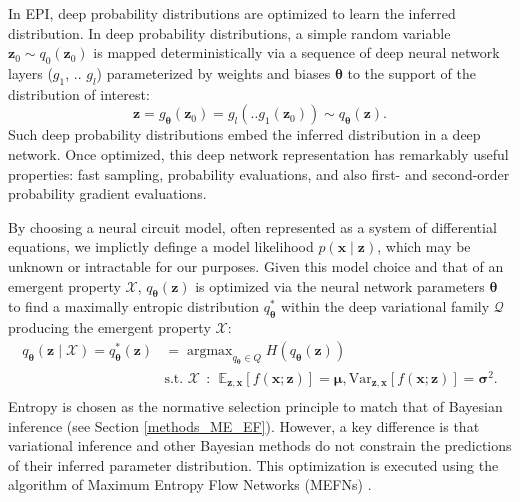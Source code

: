 \documentclass[11pt]{article}
\DeclareMathOperator*{\argmax}{argmax}
\begin{document}
In EPI, deep probability distributions are optimized to learn the inferred distribution.
 In deep probability distributions, a simple random variable $\mathbf{z}_0 \sim q_0(\mathbf{z}_0)$ is mapped deterministically via a sequence of deep neural network layers ($g_1$, .. $g_l$) parameterized by weights and biases $\bm{\theta}$ to the support of the distribution of interest:
\begin{equation}
\label{eq:deep_transform}
\mathbf{z} = g_{\bm{\theta}}(\mathbf{z}_0) = g_l(..g_1(\mathbf{z}_0)) \sim q_{\bm{\theta}}(\mathbf{z}).
\end{equation}
Such deep probability distributions embed the inferred distribution in a deep network.
Once optimized, this deep network representation has remarkably useful properties: fast sampling, probability evaluations, and also first- and second-order probability gradient evaluations.

By choosing a neural circuit model, often represented as a system of differential equations, we implictly definge a model likelihood $p(\mathbf{x} \mid \mathbf{z})$, which may be unknown or intractable for our purposes.  Given this model choice and that of an emergent property $\mathcal{X}$, $q_{\bm{\theta}}(\mathbf{z})$ is optimized via the neural network parameters $\bm{\theta}$ to find a maximally entropic distribution $q_{\bm{\theta}}^*$ within the deep variational family $\mathcal{Q}$ producing the emergent property $\mathcal{X}$:
\begin{equation} \label{eq:opt}
\begin{split}
q_{\bm{\theta}}(\mathbf{z} \mid \mathcal{X}) = q_{\bm{\theta}}^*(\mathbf{z}) &= \argmax_{q_{\bm{\theta}} \in Q} H(q_{\bm{\theta}}(\mathbf{z})) \\
 &  \text{s.t.  } \mathcal{X} ~~:~~ \mathbb{E}_{\mathbf{z},\mathbf{x}}\left[f(\mathbf{x}; \mathbf{z})\right] = \bm{\mu}, \text{Var}_{\mathbf{z},\mathbf{x}}\left[f(\mathbf{x}; \mathbf{z})\right] = \bm{\sigma}^2. \\
 \end{split}
\end{equation} 
Entropy is chosen as the normative selection principle to match that of Bayesian inference (see Section \ref{methods_ME_EF}).
However, a key difference is that variational inference and other Bayesian methods do not constrain the predictions of their inferred parameter distribution.
This optimization is executed using the algorithm of Maximum Entropy Flow Networks (MEFNs) \cite{loaiza2017maximum}.
\end{document}
